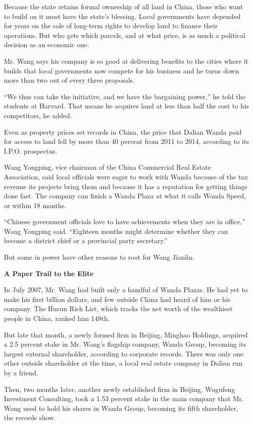 Because the state retains formal ownership of all land in China, those
who want to build on it must have the state's blessing. Local
governments have depended for years on the sale of long-term rights to
develop land to finance their operations. But who gets which parcels,
and at what price, is as much a political decision as an economic one.

Mr. Wang says his company is so good at delivering benefits to the
cities where it builds that local governments now compete for his
business and he turns down more than two out of every three proposals.

``We thus can take the initiative, and we have the bargaining power,''
he told the students at Harvard. That means he acquires land at less
than half the cost to his competitors, he added.

Even as property prices set records in China, the price that Dalian
Wanda paid for access to land fell by more than 40 percent from 2011 to
2014, according to its I.P.O. prospectus.

Wang Yongping, vice chairman of the China Commercial Real Estate
Association, said local officials were eager to work with Wanda because
of the tax revenue its projects bring them and because it has a
reputation for getting things done fast. The company can finish a Wanda
Plaza at what it calls Wanda Speed, or within 18 months.

``Chinese government officials love to have achievements when they are
in office,'' Wang Yongping said. ``Eighteen months might determine
whether they can become a district chief or a provincial party
secretary.''

But some in power have other reasons to root for Wang Jianlin.

\textbf{A Paper Trail to the Elite}

In July 2007, Mr. Wang had built only a handful of Wanda Plazas. He had
yet to make his first billion dollars, and few outside China had heard
of him or his company. The Hurun Rich List, which tracks the net worth
of the wealthiest people in China, ranked him 148th.

But late that month, a newly formed firm in Beijing, Minghao Holdings,
acquired a 2.5 percent stake in Mr. Wang's flagship company, Wanda
Group, becoming its largest external shareholder, according to corporate
records. There was only one other outside shareholder at the time, a
local real estate company in Dalian run by a friend.

Then, two months later, another newly established firm in Beijing,
Wugufeng Investment Consulting, took a 1.53 percent stake in the main
company that Mr. Wang used to hold his shares in Wanda Group, becoming
its fifth shareholder, the records show.

